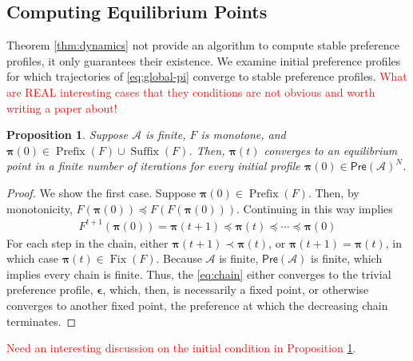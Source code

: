 \documentclass[conference]{ieeeconf}
\newcommand{\A}{\mathcal{A}}
\newcommand{\Pref}{\mathsf{Pre}}
\newcommand{\profile}{\boldsymbol{\pi}}
\DeclareMathOperator{\Fix}{Fix}
\DeclareMathOperator{\Pre}{Prefix}
\DeclareMathOperator{\Post}{Suffix}
\newtheorem{proposition}{Proposition}
\begin{document}
\subsection{Computing Equilibrium Points}

Theorem \ref{thm:dynamics} not provide an algorithm to compute stable preference profiles, it only guarantees their existence. We examine initial preference profiles for which trajectories of \eqref{eq:global-pi} converge to stable preference profiles. \textcolor{red}{What are REAL interesting cases that they conditions are not obvious and worth writing a paper about!}

\begin{proposition} \label{prop:initial-conditions}
    Suppose $\A$ is finite, $F$ is monotone, and $\profile(0) \in \Pre(F) \cup \Post(F)$. Then, $\profile(t)$ converges to an equilibrium point in a finite number of iterations for every initial profile $\profile(0) \in \Pref(\A)^N$.
\end{proposition}
\begin{proof}
    We show the first case. Suppose $\profile(0) \in \Pre(F)$. Then, by monotonicity, $F(\profile(0)) \preceq F\left( F(\profile(0))\right)$. Continuing in this way implies
    \begin{align}
        F^{t+1}\left( \profile(0)\right)  = \profile(t+1) \preceq \profile(t) \preceq \cdots \preceq \profile(0) \label{eq:chain}
    \end{align} For each step in the chain, either $\profile(t+1) \prec \profile(t)$, or $\profile(t+1) = \profile(t)$, in which case $\profile(t) \in \Fix(F)$. Because $\A$ is finite, $\Pref(\A)$ is finite, which implies every chain is finite. Thus, the \eqref{eq:chain} either converges to the trivial preference profile, $\boldsymbol{\epsilon}$, which, then, is necessarily a fixed point, or otherwise converges to another fixed point, the preference at which the decreasing chain terminates.
\end{proof}

\textcolor{red}{Need an interesting discussion on the initial condition in Proposition \ref{prop:initial-conditions}.}

\end{document}
